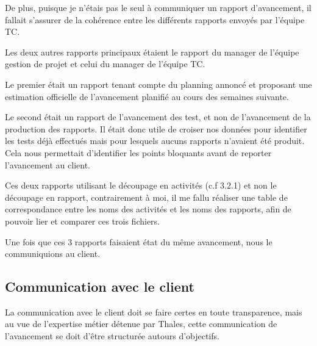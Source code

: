 De plus, puisque je n'étais pas le seul à communiquer un rapport d'avancement, il fallait s'assurer de la cohérence entre les différents rapports envoyés par l'équipe \gls{TC}.

Les deux autres rapports principaux étaient le rapport du manager de l'équipe gestion de projet et celui du manager de l'équipe \gls{TC}.

Le premier était un rapport tenant compte du planning annoncé et proposant une estimation officielle de l'avancement planifié au cours des semaines suivante.

Le second était un rapport de l'avancement des test, et non de l'avancement de la production des rapports. Il était donc utile de croiser nos données pour identifier les tests déjà effectués mais pour lesquels aucuns rapports n'avaient été produit. 
Cela nous permettait d'identifier les points bloquants avant de reporter l'avancement au client.

Ces deux rapports utilisant le découpage en activités (c.f 3.2.1) et non le découpage en rapport, contrairement à moi, il me fallu réaliser une table de correspondance entre les noms des activités et les noms des rapports, afin de pouvoir lier et comparer ces trois fichiers.

Une fois que ces 3 rapports faisaient état du même avancement, nous le communiquions au client.


\subsection{Communication avec le client}

La communication avec le client doit se faire certes en toute transparence, mais au vue de l'expertise métier détenue par Thales, cette communication de l'avancement se doit d'être structurée autours d'objectifs. 

